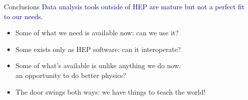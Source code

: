 \documentclass[aspectratio=169]{beamer}
\begin{document}
\begin{frame}{Conclusions}
\Large
\vspace{0.75 cm}
\textcolor{darkblue}{Data analysis tools outside of HEP are mature but not a perfect fit to our needs.}

\vspace{0.35 cm}
\begin{itemize}\setlength{\itemsep}{0.35 cm}
\item Some of what we need is available now: can we use it?
\item Some exists only as HEP software: can it interoperate?
\item Some of what's available is unlike anything we do now:\\an opportunity to do better physics?
\item<2-> The door swings both ways: we have things to teach the world!
\end{itemize}
\end{frame}
\end{document}
